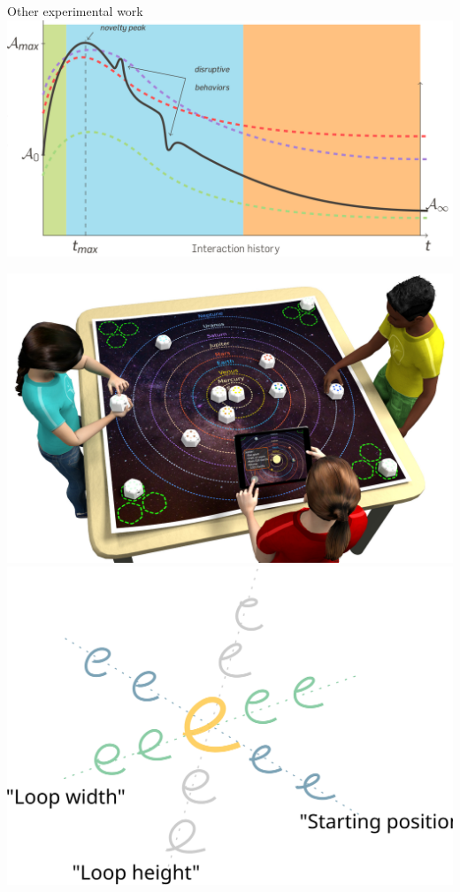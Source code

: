 \documentclass[compress]{beamer}
\begin{document}
\begin{frame}{Other experimental work}
            \hspace{0.5em}
            \hyperlink{anthropomorphism}{\includegraphics[height=0.2\paperheight]{dynamics_anthropo}}

            \hyperlink{cellulo}{\includegraphics[height=0.2\paperheight]{cellulo/concept-solar-system}}
            \hspace{0.5em}
            \hyperlink{cowriter-impl}{\includegraphics[height=0.2\paperheight]{cowriter/pca}}


\end{frame}
\end{document}
